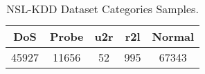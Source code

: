 \begin{table}[H]
\centering
\caption{NSL-KDD Dataset Categories Samples.}
\label{nslkddsamples}
\begin{tabular}{@{}ccccc@{}}
\toprule
DoS & Probe & u2r & r2l & Normal  \\
\midrule
45927 & 11656 & 52 & 995 & 67343 \\ 
\bottomrule
\end{tabular}
\end{table}
